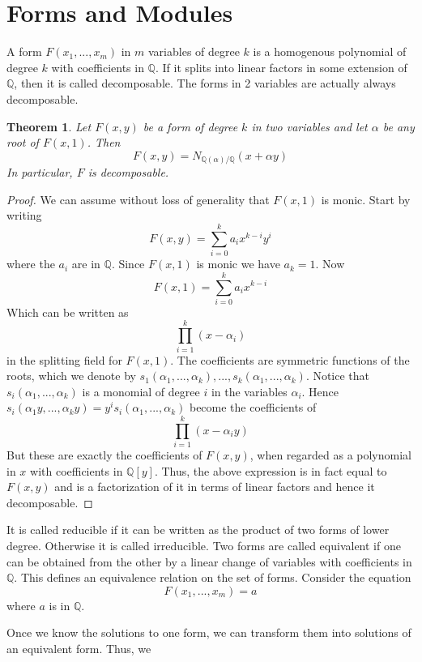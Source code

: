 \documentclass{article}
\newtheorem{theorem}{Theorem}[section]
\newcommand{\mbb}[1]{\mathbb{#1}}
\begin{document}
\section{Forms and Modules}
A form $F(x_1, ..., x_m)$ in $m$ variables of degree $k$ is a homogenous polynomial of degree $k$ with coefficients in $\mbb{Q}$. If it splits into linear factors in some extension of $\mbb{Q}$, then it is called decomposable. The forms in 2 variables are actually always decomposable. 

\begin{theorem}\label{thm: Forms in two variables are decomposable}
    Let $F(x, y)$ be a form of degree $k$ in two variables and let $\alpha$ be any root of $F(x, 1)$. Then 
    $$F(x, y) = N_{\mbb Q (\alpha) / \mbb Q}(x + \alpha y)$$ 
    In particular, $F$ is decomposable.
\end{theorem}


\begin{proof}
    We can assume without loss of generality that $F(x, 1)$ is monic. Start by writing
    $$F(x, y) = \sum_{i=0}^k a_i x^{k-i} y^i$$
    where the $a_i$ are in $\mbb{Q}$. Since $F(x, 1)$ is monic we have $a_k = 1$. Now 
    $$F(x, 1) = \sum_{i=0}^k a_i x^{k-i}$$
    Which can be written as
    $$\prod_{i=1}^k (x - \alpha_i)$$
    in the splitting field for $F(x,1)$. The coefficients are symmetric functions of the roots, which we denote by $s_1(\alpha_1, ..., \alpha_k), ..., s_k(\alpha_1, ..., \alpha_k)$. Notice that $s_i(\alpha_1, ..., \alpha_k)$ is a monomial of degree $i$ in the variables $\alpha_i$. Hence $s_i(\alpha_1y, ..., \alpha_k y) = y^i s_i(\alpha_1, ..., \alpha_k)$ become the coefficients of 
    $$\prod_{i=1}^k (x - \alpha_iy)$$
    But these are exactly the coefficients of $F(x,y)$, when regarded as a polynomial in $x$ with coefficients in $\mbb{Q}[y]$. Thus, the above expression is in fact equal to $F(x,y)$ and is a factorization of it in terms of linear factors and hence it decomposable.
\end{proof}




It is called reducible if it can be written as the product of two forms of lower degree. Otherwise it is called irreducible. Two forms are called equivalent if one can be obtained from the other by a linear change of variables with coefficients in $\mbb{Q}$. This defines an equivalence relation on the set of forms. Consider the equation 
$$F(x_1, ..., x_m) = a$$
where $a$ is in $\mbb{Q}$. 

Once we know the solutions to one form, we can transform them into solutions of an equivalent form. Thus, we \
\end{document}
